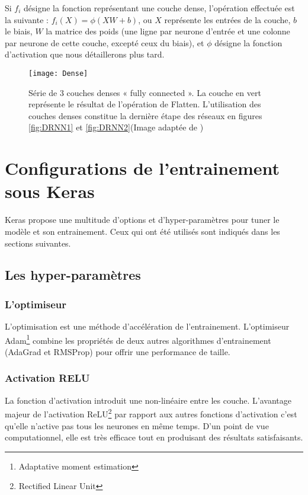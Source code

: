 Si $f_i$ désigne la fonction représentant une couche dense, l'opération effectuée est la suivante : $f_i(X)=\phi(XW+b)$, ou $X$ représente les entrées de la couche, $b$ le biais, $W$ la matrice des poids (une ligne par neurone d'entrée et une colonne par neurone de cette couche, excepté ceux du biais), et $\phi$ désigne la fonction d'activation que nous détaillerons plus tard. \parencite[286]{Reference8}

\begin{figure}[!h] 
\centering
\texttt{[image: Dense]} 
\decoRule
\caption[Dense]{Série de 3 couches denses « fully connected ». La couche en vert représente le résultat de l'opération de Flatten. L'utilisation des couches denses constitue la dernière étape des réseaux en figures \ref{fig:DRNN1} et \ref{fig:DRNN2}(Image adaptée de \parencite{Reference9})}
\label{fig:Dense}
\end{figure}


\section{Configurations de l'entrainement sous Keras}
Keras propose une multitude d'options et d'hyper-paramètres pour tuner le modèle et son entrainement. Ceux qui ont été utilisés sont indiqués dans les sections suivantes.

\subsection{Les hyper-paramètres}

\subsubsection{L'optimiseur}
L'optimisation est une méthode d'accélération de l'entrainement. L'optimiseur Adam\footnote{Adaptative moment estimation} combine les propriétés de deux autres algorithmes d'entrainement (AdaGrad et RMSProp) pour offrir une performance de taille.

\subsubsection{Activation RELU}
La fonction d'activation introduit une non-linéaire entre les couche. L'avantage majeur de l'activation ReLU\footnote{Rectified Linear Unit} par rapport aux autres fonctions d'activation c'est qu'elle n'active pas tous les neurones en même temps. D'un point de vue computationnel, elle est très efficace tout en produisant des résultats satisfaisants.


